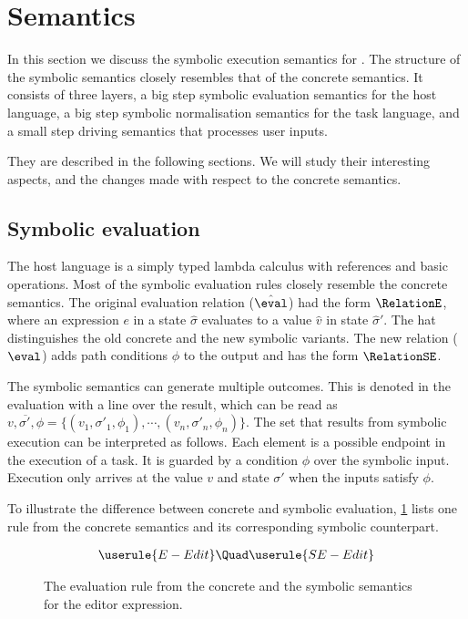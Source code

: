
\section{Semantics}
\label{sec:semantics}

In this section we discuss the symbolic execution semantics for \TOPHAT.
The structure of the symbolic semantics closely resembles that of the concrete semantics.
It consists of three layers, a big step symbolic evaluation semantics for the host language, a big step symbolic normalisation semantics for the task language, and a small step driving semantics that processes user inputs.

They are described in the following sections.
We will study their interesting aspects, and the changes made with respect to the concrete semantics.



\subsection{Symbolic evaluation}

The host language is a simply typed lambda calculus with references and basic operations.
Most of the symbolic evaluation rules closely resemble the concrete semantics.
The original evaluation relation ($\hat{\eval}$) had the form $\RelationE$,
where an expression $e$ in a state $\hat{\sigma}$ evaluates to a value $\hat{v}$ in state $\hat{\sigma}'$.
The hat distinguishes the old concrete and the new symbolic variants.
The new relation ($\eval$) adds path conditions $\phi$ to the output and has the form $\RelationSE$.

The symbolic semantics can generate multiple outcomes.
This is denoted in the evaluation with a line over the result, which can be read as $\overline{v,\sigma',\phi} = \{(v_1,\sigma'_1,\phi_1),\cdots,(v_n,\sigma'_n,\phi_n)\}$.
The set that results from symbolic execution can be interpreted as follows.
Each element is a possible endpoint in the execution of a task.
It is guarded by a condition $\phi$ over the symbolic input.
Execution only arrives at the value $v$ and state $\sigma'$ when the inputs satisfy $\phi$.

To illustrate the difference between concrete and symbolic evaluation, \cref{fig:oldToNewSemantics} lists one rule from the concrete semantics and its corresponding symbolic counterpart.

\begin{figure}[h]
  \small
  \begin{gather*}
    \userule{E-Edit}\Quad
    \userule{SE-Edit}
  \end{gather*}
  \caption{The evaluation rule from the concrete and the symbolic semantics for the editor expression.}
  \label{fig:oldToNewSemantics}
\end{figure}

